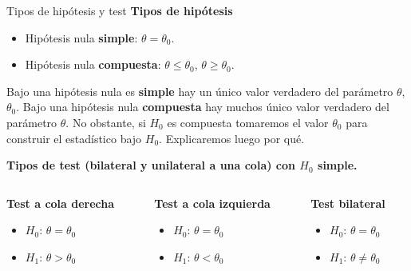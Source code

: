 \documentclass{beamer}
\theoremstyle{definition}
\begin{document}
\begin{frame}{\color{rosee}Tipos de hipótesis y test}\small
  \textbf{Tipos de hip\'otesis}\small
    \begin{itemize}
    \item Hip\'otesis nula \textbf{simple}: $\theta = \theta_0$.
    \item Hip\'otesis nula \textbf{compuesta}: $\theta \leq \theta_0$, \quad 
      $\theta \geq \theta_0$.
    \end{itemize}

    Bajo una hipótesis nula es \textbf{simple} hay un único valor verdadero del parámetro $\theta$, $\theta_0$. Bajo una hipótesis nula \textbf{compuesta} hay muchos único valor verdadero del parámetro $\theta$. No obstante, si $H_0$ es compuesta tomaremos el valor $\theta_0$ para construir el estadístico bajo $H_0$. Explicaremos luego por qué.
    
  \vspace{5pt}
  
\textbf{Tipos de test (bilateral y unilateral a una cola) con $H_0$ simple.}
  \begin{columns}
        \begin{column}{0.32\textwidth}
        \begin{center}
          \textbf{Test a cola derecha}
          \begin{itemize}
          \item $H_0$:  $\theta = \theta_0$
          \item $H_1$: $\theta > \theta_0$
          \end{itemize}
          \end{center}
      \end{column}
        \begin{column}{0.32\textwidth}
        \begin{center}
        \textbf{Test a cola izquierda}
           \begin{itemize}
          \item $H_0$: $\theta = \theta_0$
          \item$H_1$: $\theta < \theta_0$
          \end{itemize}
          \end{center}
      \end{column}
        \begin{column}{0.32\textwidth}
        \begin{center}
        \textbf{Test bilateral}
           \begin{itemize}
          \item $H_0$: $\theta = \theta_0$
          \item$H_1$: $\theta \neq \theta_0$
          \end{itemize}
          \end{center}
      \end{column}
  \end{columns}


\end{frame}
\end{document}
